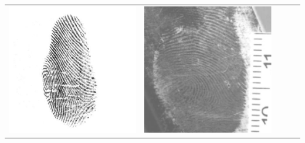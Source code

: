 \documentclass[journal]{IEEEtran}
\begin{document}
\begin{table}[!t]
\begin{tabular}{| m{1.5cm}<{\centering} | m{3.7cm}<{\centering} | m{3.7cm}<{\centering} | m{3.7cm}<{\centering} | m{3.7cm}<{\centering} |}
\begin{minipage}[][20mm][c]{.1\textwidth}
			\includegraphics[width=\linewidth]{images/db_ex_2.pdf}
		\end{minipage}
		& \begin{minipage}[][20mm][c]{.1\textwidth}\centering
			\includegraphics[width=\linewidth]{images/db_ex_3.pdf}

\end{minipage}
\end{tabular}
\end{table}
\end{document}
